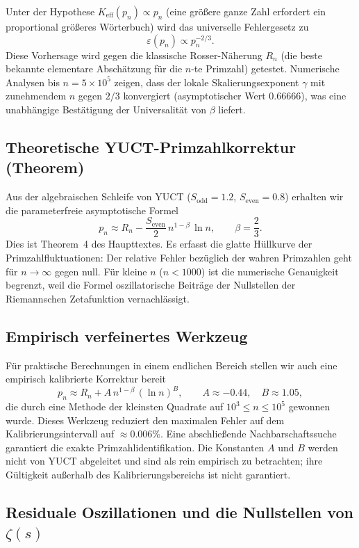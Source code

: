 \documentclass[11pt,a4paper]{article}
\begin{document}
	Unter der Hypothese \(K_{\mathrm{eff}}(p_n) \propto p_n\) (eine größere ganze Zahl erfordert ein proportional größeres Wörterbuch) wird das universelle Fehlergesetz zu
	\[
	\varepsilon(p_n) \propto p_n^{-2/3}.
	\]
	Diese Vorhersage wird gegen die klassische Rosser-Näherung \(R_n\) (die beste bekannte elementare Abschätzung für die \(n\)-te Primzahl) getestet. Numerische Analysen bis \(n = 5\times10^5\) zeigen, dass der lokale Skalierungsexponent \(\gamma\) mit zunehmendem \(n\) gegen \(2/3\) konvergiert (asymptotischer Wert \(0.66666\)), was eine unabhängige Bestätigung der Universalität von \(\beta\) liefert.
	
	\subsection{Theoretische YUCT-Primzahlkorrektur (Theorem)}
	
	Aus der algebraischen Schleife von YUCT (\(S_{\mathrm{odd}}=1.2\), \(S_{\mathrm{even}}=0.8\)) erhalten wir die parameterfreie asymptotische Formel
	\[
	\boxed{p_n \approx R_n - \frac{S_{\mathrm{even}}}{2}\, n^{1-\beta}\,\ln n},
	\qquad \beta = \frac{2}{3}.
	\]
	Dies ist Theorem~4 des Haupttextes. Es erfasst die glatte Hüllkurve der Primzahlfluktuationen: Der relative Fehler bezüglich der wahren Primzahlen geht für \(n\to\infty\) gegen null. Für kleine \(n\) (\(n < 1000\)) ist die numerische Genauigkeit begrenzt, weil die Formel oszillatorische Beiträge der Nullstellen der Riemannschen Zetafunktion vernachlässigt.
	
	\subsection{Empirisch verfeinertes Werkzeug}
	
	Für praktische Berechnungen in einem endlichen Bereich stellen wir auch eine empirisch kalibrierte Korrektur bereit
	\[
	p_n \approx R_n + A\, n^{1-\beta}\,(\ln n)^B,
	\qquad A \approx -0.44,\quad B \approx 1.05,
	\]
	die durch eine Methode der kleinsten Quadrate auf \(10^3\le n\le 10^5\) gewonnen wurde. Dieses Werkzeug reduziert den maximalen Fehler auf dem Kalibrierungsintervall auf \(\approx 0.006\%\). Eine abschließende Nachbarschaftssuche garantiert die exakte Primzahlidentifikation. Die Konstanten \(A\) und \(B\) werden nicht von YUCT abgeleitet und sind als rein empirisch zu betrachten; ihre Gültigkeit außerhalb des Kalibrierungsbereichs ist nicht garantiert.
	
	\subsection{Residuale Oszillationen und die Nullstellen von \(\zeta(s)\)}
	
\end{document}
